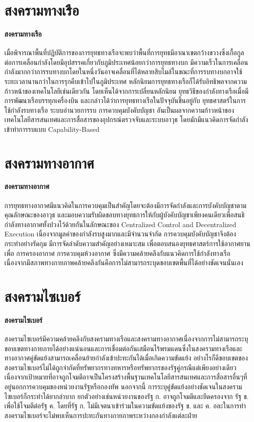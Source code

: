 \documentclass[../th_cyber_warfare_distilled.tex]{subfiles}
\begin{document}
\section{สงครามทางเรือ}
\paragraph{สงครามทางเรือ}
เมื่อพิจารณาพื้นที่ปฏิบัติการของการยุทธทางเรือจะพบว่าพื้นที่การยุทธมีอาณาเขตกว้างขวางซึ่งเกื้อกูลต่อการเคลื่อนกำลังโดยมีอุปสรรคเกี่ยวกับภูมิประเทศน้อยกว่าการยุทธทางบก มีความเร็วในการเคลื่อนกำลังมากกว่าการรบทางบกโดยในหนึ่งวันอาจเคลื่อนที่ได้หลายสิบไมล์ในขณะที่การรบทางบกอาจใช้ระยะเวลานานกว่าในการรุกคืบเข้าไปในภูมิประเทศ หลักนิยมการยุทธทางเรือก็ได้รับอิทธิพลจากความก้าวหน้าของเทคโนโลยีเช่นเดียวกัน โดยเห็นได้จากการเปลี่ยนหลักนิยม ยุทธวิธีของกำลังทางเรือเมื่อมีการพัฒนาเรือบรรทุกเครื่องบิน และกล่าวได้ว่าการยุทธทางเรือในปัจจุบันขึ้นอยู่กับ ยุทธศาสตร์ในการใช้กำลังรบทางเรือ ระบบอำนวยการรบ การควบคุมบังคับบัญชา อันเป็นผลจากความก้าวหน้าของเทคโนโลยีสารสนเทศและการสื่อสารของอุปกรณ์ตรวจจับและระบบอาวุธ โดยมักมีแนวคิดการจัดกำลังเข้าทำการรบแบบ Capability-Based
\section{สงครามทางอากาศ}
\paragraph{สงครามทางอากาศ}
การยุทธทางอากาศมีแนวคิดในการควบคุมเป็นสำคัญโดยจะต้องมีการจัดกำลังและการบังคับบัญชาตามคุณลักษณะของอาวุธ และมอบความรับผิดชอบทางยุทธการให้กับผู้บังคับบัญชาเพียงคนเดียวเพื่อสนธิกำลังทางอากาศทั้งปวงไว้ด้วยกันในลักษณะของ Centralized Control and Decentralized Execution เนื่องจากมูลค่าของกำลังรบสูงมากและมีจำนวนจำกัด การควบคุมบังคับบัญชาจึงต้องกระทำอย่างรัดกุม มีการจัดลำดับความสำคัญอย่างเหมาะสม เพื่อตอบสนองยุทธศาสตร์การใช้อากาศยานเพื่อ การครองอากาศ การควบคุมห้วงอากาศ ซึ่งมีความคล้ายคลึงกับแนวคิดการใช้กำลังทางเรือเนื่องจากมีสภาพทางกายภาพคล้ายคลึงกันคือการไม่สามารถระบุดขอบเขตพื้นที่ได้อย่างชัดเจนนั่นเอง

\section{สงครามไซเบอร์}
\paragraph{สงครามไซเบอร์}
สงครามไซเบอร์มีความคล้ายคลึงกับสงครามทางเรือและสงครามทางอากาศเนื่องจากการไม่สามารถระบุขอบเขตทางกายภายได้อย่างแน่นอนและการเชื่อมต่อกันเสมือนไร้พรมแดนซึ่งในสงครามทางเรือและทางอากาศคู่ขัดแย้งสามารถเคลื่อนย้ายกำลังเข้าปะทะกันได้เมื่อเกิดความขัดแย้ง อย่างไรก็ดีขอบเขตของสงครามไซเบอร์ไม่ได้ถูกจำกัดที่ทรัพยากรทางทหารหรือทรัพยากรของรัฐคู่กรณีแต่เพียงอย่างเดียวเนื่องจากเป้าหมายที่อาจถูกโจมตีอาจเป็นโครงสร้างพื้นฐานเทคโนโลยีสารสนเทศและการสื่อสารอื่นๆที่อยู่นอกการควบคุมของหน่วยงานรัฐหรือกองทัพ นอกจากนี้ การระบุคู่ขัดแย้งอย่างชัดเจนในสงครามไซเบอร์ก็กระทำได้ยากลำบาก ยกตัวอย่างเช่นหน่วยงานของรัฐ ก. อาจถูกโจมตีและยึดครองจาก รัฐ ข. เพื่อใช้โจมตีต่อรัฐ ค. โดยที่รัฐ ก. ไม่มีเจตนาเข้าร่วมในความขัดแย้งของรัฐ ข. และ ค. อละในการทำสงครามไซเบอร์จะไม่พบเห็นการปะทะกันทางกายภาพระหว่างกองกำลังแต่ละฝ่าย
\end{document}
